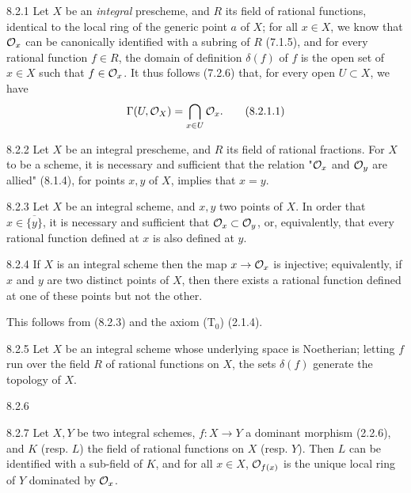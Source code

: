 \documentclass[../main.tex]{subfiles}
\begin{document}
\begin{cx}{8.2.1}
    Let $X$ be an \emph{integral} prescheme, and $R$ its field of rational functions, identical to the local ring of the generic point $a$ of $X$; for all $x\in X$, we know that $\mathcal{O}_x$ can be canonically identified with a subring of $R$ (7.1.5), and for every rational function $f\in R$, the domain of definition $\delta(f)$ of $f$ is the open set of $x\in X$ such that $f\in\mathcal{O}_x$.
    It thus follows (7.2.6) that, for every open $U\subset X$, we have
    \begin{equation*}
        \Gamma(U,\mathcal{O}_X) = \bigcap_{x\in U}\mathcal{O}_x.\tag{8.2.1.1}
    \end{equation*}
\end{cx}

\begin{cx}[Proposition]{8.2.2}
    Let $X$ be an integral prescheme, and $R$ its field of rational fractions.
    For $X$ to be a scheme, it is necessary and sufficient that the relation "$\mathcal{O}_x$ and $\mathcal{O}_y$ are allied" (8.1.4), for points $x,y$ of $X$, implies that $x=y$.
\end{cx}

\begin{cx}[Corollary]{8.2.3}
    Let $X$ be an integral scheme, and $x,y$ two points of $X$.
    In order that $x\in\overline{\{y\}}$, it is necessary and sufficient that $\mathcal{O}_x\subset\mathcal{O}_y$, or, equivalently, that every rational function defined at $x$ is also defined at $y$.
\end{cx}

\begin{cx}[Corollary]{8.2.4}
    If $X$ is an integral scheme then the map $x\to\mathcal{O}_x$ is injective; equivalently, if $x$ and $y$ are two distinct points of $X$, then there exists a rational function defined at one of these points but not the other.
\end{cx}

This follows from (8.2.3) and the axiom ($\mathrm{T}_0$) (2.1.4).

\begin{cx}[Corollary]{8.2.5}
    Let $X$ be an integral scheme whose underlying space is Noetherian; letting $f$ run over the field $R$ of rational functions on $X$, the sets $\delta(f)$ generate the topology of $X$.
\end{cx}

\begin{cx}{8.2.6}
\end{cx}

\begin{cx}[Proposition]{8.2.7}
    Let $X,Y$ be two integral schemes, $f\colon X\to Y$ a dominant morphism (2.2.6), and $K$ (resp. $L$) the field of rational functions on $X$ (resp. $Y$).
    Then $L$ can be identified with a sub-field of $K$, and for all $x\in X$, $\mathcal{O}_{f(x)}$ is the unique local ring of $Y$ dominated by $\mathcal{O}_x$.
\end{cx}
\end{document}
